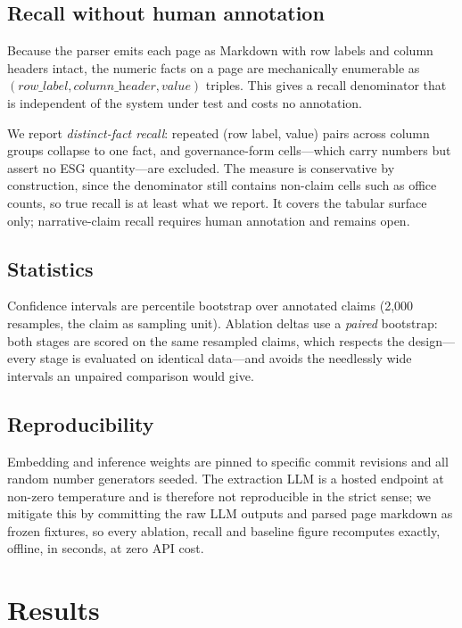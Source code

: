 \documentclass[3p,times]{elsarticle}
\begin{document}
\subsection{Recall without human annotation}
\label{sec:recall-method}

Because the parser emits each page as Markdown with row labels and column headers
intact, the numeric facts on a page are mechanically enumerable as
$(\textit{row\_label}, \textit{column\_header}, \textit{value})$ triples. This
gives a recall denominator that is independent of the system under test and costs
no annotation.

We report \emph{distinct-fact recall}: repeated (row label, value) pairs across
column groups collapse to one fact, and governance-form cells---which carry
numbers but assert no ESG quantity---are excluded. The measure is conservative by
construction, since the denominator still contains non-claim cells such as office
counts, so true recall is at least what we report. It covers the tabular surface
only; narrative-claim recall requires human annotation and remains open.

\subsection{Statistics}

Confidence intervals are percentile bootstrap over annotated claims (2{,}000
resamples, the claim as sampling unit). Ablation deltas use a \emph{paired}
bootstrap: both stages are scored on the same resampled claims, which respects
the design---every stage is evaluated on identical data---and avoids the
needlessly wide intervals an unpaired comparison would give.

\subsection{Reproducibility}

Embedding and inference weights are pinned to specific commit revisions and all
random number generators seeded. The extraction LLM is a hosted endpoint at
non-zero temperature and is therefore not reproducible in the strict sense; we
mitigate this by committing the raw LLM outputs and parsed page markdown as
frozen fixtures, so every ablation, recall and baseline figure recomputes
exactly, offline, in seconds, at zero API cost.

\section{Results}
\end{document}
